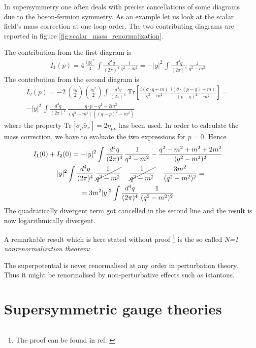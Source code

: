\documentclass[12pt]{article}
\begin{document}
In supersymmetry one often deals with precise cancellations of some diagrams due to the boson-fermion symmetry. As an example let us look at the scalar field's mass correction at one loop order. The two contributing diagrams are reported in figure \ref{fig:scalar_mass_renormalization}.
\raggedright The contribution from the first diagram is
\begin{gather*}
  I_1(p) = 4 \,\frac{i|y|^2}{4} \, \int \frac{d^4 q}{(2\pi)^4} \, \frac{i}{q^2 - m^2} = - |y|^2 \, \int \frac{d^4 q}{(2\pi)^4} \, \frac{1}{q^2 - m^2}
\end{gather*}
The contribution from the second diagram is 
\begin{gather*}
  I_2(p) = - 2 \, \left(\frac{iy}{2}\right)\left(\frac{iy^*}{2}\right) \int \frac{d^4 q}{(2\pi)^4} \, \text{Tr}\left[\frac{i(\sigma \cdot q + m)}{q^2 - m^2} \, \frac{i(\bar\sigma \cdot (p-q) + m)}{(p-q)^2 - m^2}\right] = \\
  - |y|^2 \, \int \frac{d^4 q}{(2\pi)^4} \, \frac{q\cdot p - q^2 - 2m^2}{(q^2-m^2) ((q-p)^2-m^2)}
\end{gather*}
where the property $\text{Tr}[\sigma_\mu \bar\sigma_\nu] = 2\eta_{\mu\nu}$ has been used. In order to calculate the mass correction, we have to evaluate the two expressions for $p=0$. Hence
\begin{gather*}
  I_1(0) + I_2(0) = -|y|^2 \int \frac{d^4q}{(2\pi)^4} \, \frac{1}{q^2-m^2} - \frac{q^2 -m^2 + m^2 + 2m^2}{(q^2-m^2)^2} \\
  -|y|^2 \int \frac{d^4q}{(2\pi)^4} \, \cancel{\frac{1}{q^2-m^2}} - \cancel{\frac{1}{q^2-m^2}} - \frac{3m^2}{(q^2-m^2)^2}= \\ 
  = 3m^2|y|^2 \int \frac{d^4q}{(2\pi)^4} \, \frac{1}{(q^2-m^2)^2}
\end{gather*}
The quadratically divergent term got cancelled in the second line and the result is now logarithmically divergent. \par 
\vspace{15pt}
A remarkable result which is here stated without proof \footnote{The proof can be found in ref. \cite{weinberg_1996}} is the so called \emph{N=1 nonrenormalization theorem}:
\begin{center}
  The superpotential is never renormalised at any order in perturbation theory. Thus it might be renormalised by non-perturbative effects such as istantons.
\end{center}

\newpage 

\section{Supersymmetric gauge theories}
\end{document}
